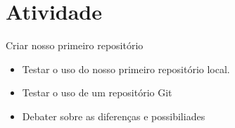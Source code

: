 \documentclass{beamer}
\begin{document}
\section{Atividade}

\begin{frame}{Criar nosso primeiro repositório}
      \begin{itemize}
            \item Testar o uso do nosso primeiro repositório local.
            \item Testar o uso de um repositório Git
            \item Debater sobre as diferenças e possibiliades
      \end{itemize}
\end{frame}

\backmatter
\end{document}
